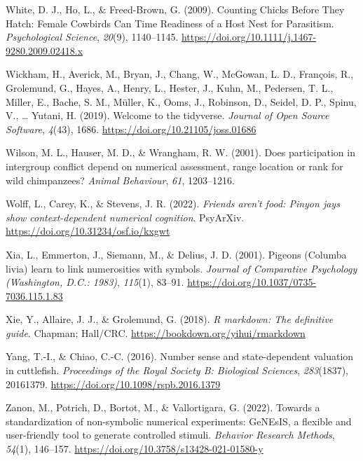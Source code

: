 \documentclass[
  ,pub,floatsintext]{apa6}
\newlength{\cslhangindent}
\newlength{\cslentryspacingunit} %
\newenvironment{CSLReferences}[2] %
 {%
  \setlength{\parindent}{0pt}
  \ifodd #1
  \let\oldpar\par
  \def\par{\hangindent=\cslhangindent\oldpar}
  \fi
  \setlength{\parskip}{#2\cslentryspacingunit}
 }%
 {}
\begin{document}
\begin{CSLReferences}{1}{0}
\leavevmode{}%
White, D. J., Ho, L., \& Freed-Brown, G. (2009). Counting {Chicks Before They Hatch}: {Female Cowbirds Can Time Readiness} of a {Host Nest} for {Parasitism}. \emph{Psychological Science}, \emph{20}(9), 1140--1145. \url{https://doi.org/10.1111/j.1467-9280.2009.02418.x}

\leavevmode{}%
Wickham, H., Averick, M., Bryan, J., Chang, W., McGowan, L. D., François, R., Grolemund, G., Hayes, A., Henry, L., Hester, J., Kuhn, M., Pedersen, T. L., Miller, E., Bache, S. M., Müller, K., Ooms, J., Robinson, D., Seidel, D. P., Spinu, V., \ldots{} Yutani, H. (2019). Welcome to the {tidyverse}. \emph{Journal of Open Source Software}, \emph{4}(43), 1686. \url{https://doi.org/10.21105/joss.01686}

\leavevmode{}%
Wilson, M. L., Hauser, M. D., \& Wrangham, R. W. (2001). Does participation in intergroup conflict depend on numerical assessment, range location or rank for wild chimpanzees? \emph{Animal Behaviour}, \emph{61}, 1203--1216.

\leavevmode{}%
Wolff, L., Carey, K., \& Stevens, J. R. (2022). \emph{Friends aren't food: Pinyon jays show context-dependent numerical cognition}. PsyArXiv. \url{https://doi.org/10.31234/osf.io/kxgwt}

\leavevmode{}%
Xia, L., Emmerton, J., Siemann, M., \& Delius, J. D. (2001). Pigeons ({Columba} livia) learn to link numerosities with symbols. \emph{Journal of Comparative Psychology (Washington, D.C.: 1983)}, \emph{115}(1), 83--91. \url{https://doi.org/10.1037/0735-7036.115.1.83}

\leavevmode{}%
Xie, Y., Allaire, J. J., \& Grolemund, G. (2018). \emph{R markdown: The definitive guide}. Chapman; Hall/CRC. \url{https://bookdown.org/yihui/rmarkdown}

\leavevmode{}%
Yang, T.-I., \& Chiao, C.-C. (2016). Number sense and state-dependent valuation in cuttlefish. \emph{Proceedings of the Royal Society B: Biological Sciences}, \emph{283}(1837), 20161379. \url{https://doi.org/10.1098/rspb.2016.1379}

\leavevmode{}%
Zanon, M., Potrich, D., Bortot, M., \& Vallortigara, G. (2022). Towards a standardization of non-symbolic numerical experiments: {GeNEsIS}, a flexible and user-friendly tool to generate controlled stimuli. \emph{Behavior Research Methods}, \emph{54}(1), 146--157. \url{https://doi.org/10.3758/s13428-021-01580-y}

\end{CSLReferences}
\end{document}
